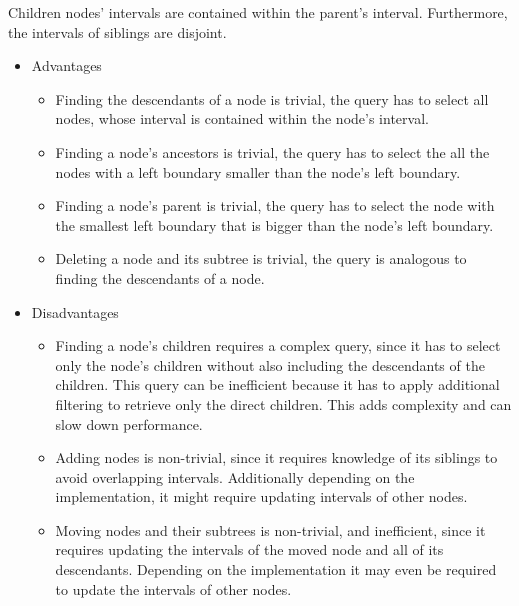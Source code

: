 \begin{itemize}
    Children nodes' intervals are contained within the parent's interval. Furthermore, the
    intervals of siblings are disjoint.
    \begin{itemize}
      \item Advantages
        \begin{itemize}
        \item Finding the descendants of a node is trivial, the query has to select all
          nodes, whose interval is contained within the node's interval.
        \item Finding a node's ancestors is trivial, the query has to select the all the
          nodes with a left boundary smaller than the node's left boundary. 
        \item Finding a node's parent is trivial, the query has to select the node with
          the smallest left boundary that is bigger than the node's left boundary.
        \item Deleting a node and its subtree is trivial, the query is analogous to finding
          the descendants of a node.
        \end{itemize}
      \item Disadvantages
        \begin{itemize}
        \item Finding a node's children requires a complex query, since it has to select
          only the node's children without also including the descendants of the
            children. This query can be inefficient because it has to apply additional filtering
            to retrieve only the direct children. This adds complexity and can slow down
            performance.
        \item Adding nodes is non-trivial, since it requires knowledge of its siblings to
          avoid overlapping intervals. Additionally depending on the implementation, it
            might require updating intervals of other nodes.
        \item Moving nodes and their subtrees is non-trivial, and inefficient, since it requires updating
          the intervals of the moved node and all of its descendants. 
        Depending on the implementation it may even be required to update the intervals of
            other nodes.
    \end{itemize}

\end{itemize}
\end{itemize}
